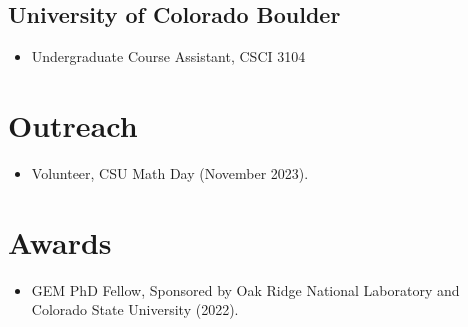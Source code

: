 \documentclass{cv_style}
\begin{document}
	\subsection{University of Colorado Boulder}
		\begin{itemize}
			\item Undergraduate Course Assistant, CSCI 3104
		\end{itemize}
		
	
	
		
	\section{Outreach}
		\begin{itemize}
			\item Volunteer, CSU Math Day (November 2023).
		\end{itemize}
		
	\section{Awards}
		\begin{itemize}
			\item GEM PhD Fellow, Sponsored by Oak Ridge National Laboratory and Colorado State University (2022).
		\end{itemize}
\end{document}
